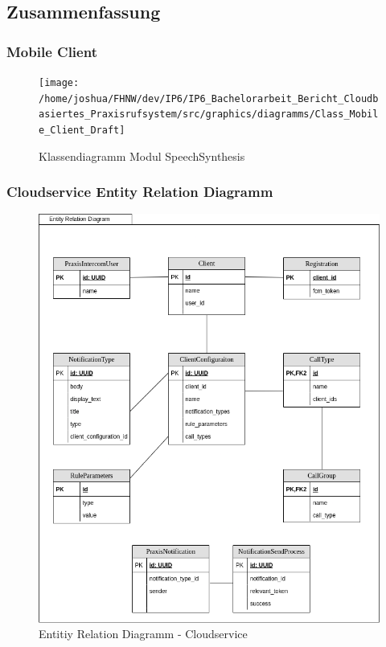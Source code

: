 \subsection{Zusammenfassung}

\subsubsection{Mobile Client}

\begin{figure}[h]
    \centering
    \begin{minipage}[b]{1\textwidth}
        \texttt{[image: /home/joshua/FHNW/dev/IP6/IP6\_Bachelorarbeit\_Bericht\_Cloudbasiertes\_Praxisrufsystem/src/graphics/diagramms/Class\_Mobile\_Client\_Draft]}
        \caption{Klassendiagramm Modul SpeechSynthesis}
    \end{minipage}
\end{figure}

\clearpage

\subsubsection{Cloudservice Entity Relation Diagramm}

\begin{figure}[h]
    \centering
    \begin{minipage}[b]{0.9\textwidth}
        \includegraphics[width=\textwidth]{graphics/diagramms/erd_v02}
        \caption{Entitiy Relation Diagramm - Cloudservice}
    \end{minipage}
\end{figure}

